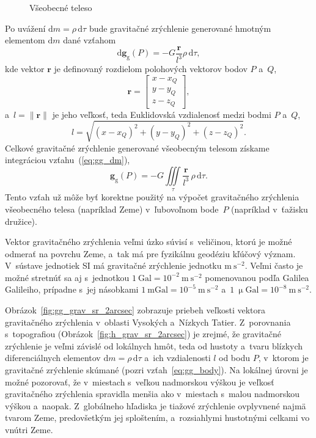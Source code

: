 \documentclass[a4paper,12pt]{book}
\newcommand{\diff}{\mathrm d}
\newcommand{\gidx}{\mathrm g}
\let\vec\mathbf
\begin{document}
\begin{figure}
\centering

\caption{Všeobecné teleso}
\label{fig:gravitating_body}
\end{figure}

Po uvážení $\diff m = \rho \, \diff \tau$ bude gravitačné zrýchlenie generované
hmotným elementom $\diff m$ dané vzťahom
%
\begin{equation}
\label{eq:gg_dm}
\diff \vec g_\gidx(P) = -G \frac{\vec r}{l^3} \rho \, \diff\tau{,}
\end{equation}
%
kde vektor $\vec r$ je definovaný rozdielom polohových vektorov bodov $P$
a~$Q$,
%
\begin{equation}
\label{eq:r}
\vec r =
%
\begin{bmatrix}
x - x_Q \\
y - y_Q \\
z - z_Q
\end{bmatrix}
{,}
\end{equation}
%
a~$l = \| \vec r \|$ je jeho veľkosť, teda Euklidovská vzdialenosť medzi bodmi
$P$ a~$Q$,
%
\begin{equation}
\label{eq:l}
l = \sqrt{(x - x_Q)^2 + (y - y_Q)^2 + (z - z_Q)^2}{.}
\end{equation}
%
Celkové gravitačné zrýchlenie generované všeobecným telesom získame
integráciou vzťahu~(\ref{eq:gg_dm}),
%
\begin{equation}
\label{eq:gg_body}
\vec g_\gidx(P) = -G \iiint\limits_{\tau} \frac{\vec r}{l^3} \, \rho \, 
\diff\tau{.}
\end{equation}
%
Tento vzťah už môže byť korektne použitý na výpočet gravitačného zrýchlenia 
všeobecného telesa (napríklad Zeme) v~ľubovoľnom bode~$P$ (napríklad v~ťažisku 
družice).

Vektor gravitačného zrýchlenia veľmi úzko súvisí s~veličinou, ktorú je možné
odmerať na povrchu Zeme, a~tak má pre fyzikálnu geodéziu kľúčový význam.
V~sústave jednotiek SI má gravitačné zrýchlenie jednotku $\mathrm{m}\
\mathrm{s}^{-2}$.  Veľmi často je možné stretnúť sa aj s~jednotkou $1\
\mathrm{Gal} = 10^{-2}\ \mathrm{m}\ \mathrm{s}^{-2}$ pomenovanou podľa Galilea
Galileiho, prípadne s~jej násobkami $1\ \mathrm{mGal} = 10^{-5}\ \mathrm{m}\
\mathrm{s}^{-2}$ a~$1\ \upmu \mathrm{Gal} = 10^{-8}\ \mathrm{m}\
\mathrm{s}^{-2}$.

Obrázok~\ref{fig:gg_grav_sr_2arcsec} zobrazuje priebeh veľkosti vektora
gravitačného zrýchlenia v~oblasti Vysokých a~Nízkych Tatier.  Z~porovnania
s~topografiou (Obrázok~\ref{fig:h_grav_sr_2arcsec}) je zrejmé, že gravitačné
zrýchlenie je veľmi závislé od lokálnych hmôt, teda od hustoty a~tvaru blízkych
diferenciálnych elementov $\diff m = \rho \, \diff \tau$ a~ich vzdialenosti $l$
od bodu $P$, v~ktorom je gravitačné zrýchlenie skúmané (pozri
vzťah~\ref{eq:gg_body}).  Na lokálnej úrovni je možné pozorovať, že v~miestach
s~veľkou nadmorskou výškou je veľkosť gravitačného zrýchlenia spravidla menšia
ako v~miestach s~malou nadmorskou výškou a~naopak.  Z~globálneho hľadiska je
tiažové zrýchlenie ovplyvnené najmä tvarom Zeme, predovšetkým jej sploštením,
a~rozsiahlymi hustotnými celkami vo vnútri Zeme.
\end{document}
